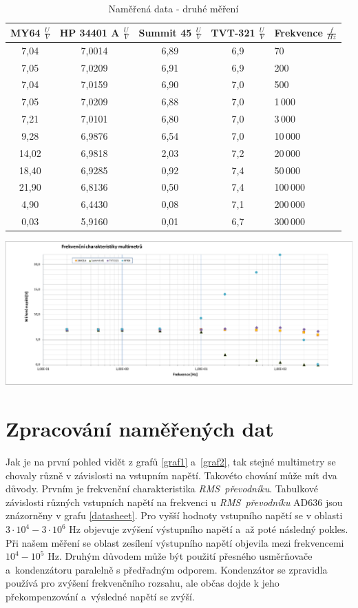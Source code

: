 \documentclass[a4paper,12pt]{article}   %
\begin{document}
\begin{table}[h!]
    \centering
    \begin{tabular}{|c|c|c|c|l|}
    \hline
    \rule{0pt}{2.5ex}MY64 $\frac{U}{V}$&HP 34401 A	$\frac{U}{V}$&Summit 45 $\frac{U}{V}$   &TVT-321 $\frac{U}{V}$   & Frekvence $\frac{f}{Hz}$\\[.7ex]\hline\hline
    7,04	& 7,0014	& 6,89	& 6,9	& 70\\\hline
    7,05	& 7,0209	& 6,91	& 6,9	& 200\\\hline
    7,04	& 7,0159	& 6,90	& 7,0	& 500\\\hline
    7,05	& 7,0209	& 6,88	& 7,0	& 1\,000\\\hline
    7,21	& 7,0101	& 6,80	& 7,0	& 3\,000\\\hline
    9,28	& 6,9876	& 6,54	& 7,0	& 10\,000\\\hline
    14,02	& 6,9818	& 2,03	& 7,2	& 20\,000\\\hline
    18,40	& 6,9285	& 0,92	& 7,4	& 50\,000\\\hline
    21,90	& 6,8136	& 0,50	& 7,4	& 100\,000\\\hline
    4,90	& 6,4430	& 0,08	& 7,1	& 200\,000\\\hline
    0,03	& 5,9160	& 0,01	& 6,7	& 300\,000\\\hline
    \end{tabular}
    \caption{Naměřená data - druhé měření}
    \label{tab:data2}
\end{table}

\begin{graf}
    \centering
    \includegraphics[width=.9\textwidth]{graf2.pdf}
    \caption{Hodnoty z druhého měření}
    \label{graf2}
\end{graf}
\section{Zpracování naměřených dat}
Jak je na první pohled vidět z grafů \ref{graf1} a~\ref{graf2}, tak stejné multimetry se chovaly různě v závislosti na vstupním napětí. Takovéto chování může mít dva důvody. Prvním je frekvenční charakteristika \textit{RMS~převodníku}. Tabulkové závislosti různých vstupních napětí na frekvenci u \textit{RMS~převodníku} AD636 jsou znázorněny v grafu \ref{datasheet}. Pro vyšší hodnoty vstupního napětí se v oblasti $3\cdot10^4 - 3\cdot10^6 \textrm{~Hz}$ objevuje zvýšení výstupního napětí a~až poté následný pokles. Při našem měření se oblast zesílení výstupního napětí objevila mezi frekvencemi $10^4 - 10^5\textrm{~Hz}$. 
Druhým důvodem může být použití přesného usměrňovače a~kondenzátoru paralelně s předřadným odporem. Kondenzátor se zpravidla používá pro zvýšení frekvenčního rozsahu, ale občas dojde k jeho překompenzování a~výsledné napětí se zvýší. 
\end{document}
